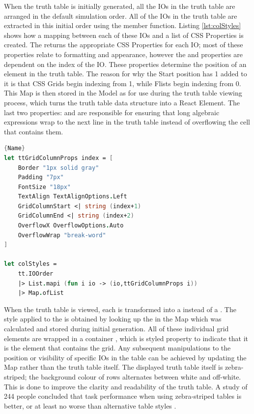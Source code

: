 When the truth table is initially generated, all the IOs in the truth table are arranged in the default simulation order. All of the IOs in the truth table are extracted in this initial order using the  member function. Listing \ref{lst:colStyles} shows how a mapping between each of these IOs and a list of CSS Properties is created. The  returns the appropriate CSS Properties for each IO; most of these properties relate to formatting and appearance, however the  and  properties are dependent on the index of the IO. These properties determine the position of an element in the truth table. The reason for why the Start position has 1 added to it is that CSS Grids begin indexing from 1, while F\fsharp lists begin indexing from 0. This Map is then stored in the Model as  for use during the truth table viewing process, which turns the truth table data structure into a React Element. The last two properties:  and  are responsible for ensuring that long algebraic expressions wrap to the next line in the truth table instead of overflowing the cell that contains them.
\begin{lstlisting}[caption=Generating CSS Properties for each IO,frame=tlrb, language=FSharp, label=lst:colStyles]{Name}
let ttGridColumnProps index = [
    Border "1px solid gray"
    Padding "7px"
    FontSize "18px"
    TextAlign TextAlignOptions.Left
    GridColumnStart <| string (index+1)
    GridColumnEnd <| string (index+2)
    OverflowX OverflowOptions.Auto
    OverflowWrap "break-word"
]

let colStyles = 
    tt.IOOrder
    |> List.mapi (fun i io -> (io,ttGridColumnProps i))
    |> Map.ofList 
\end{lstlisting}

When the truth table is viewed, each  is transformed into a  instead of a . The style applied to the  is obtained by looking up the  in the  Map which was calculated and stored during initial generation. All of these individual grid elements are wrapped in a container , which is styled property  to indicate that it is the element that contains the grid. Any subsequent manipulations to the position or visibility of specific IOs in the table can be achieved by updating the  Map rather than the truth table itself. The displayed truth table itself is zebra-striped; the background colour of rows alternates between white and off-white. This is done to improve the clarity and readability of the truth table. A study of 244 people concluded that task performance when using zebra-striped tables is better, or at least no worse than alternative table styles \cite{zebrastripes}.


